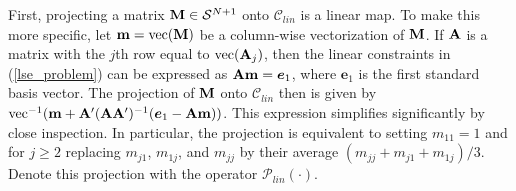 \documentclass[11pt]{article}
\newcommand{\R}{\mathbb{R}}
\theoremstyle{definition}
\theoremstyle{definition}
\def\s{{\bf s}}
\def\m{{\bf m}}
\def\A{{\bf A}}
\def\M{{\bf M}}
\def\vec{\text{vec}}
\begin{document}
%
%







First, projecting a matrix $\M \in \mathcal{S}^{N+1}$  onto $\mathcal{C}_{lin}$ is a linear map. To make this more specific, let $\m = \vec(\M)$ be a column-wise vectorization of $\M$. 
If $\A$ is a matrix with the $j$th row equal to $\vec(\A_j)$, then the  linear constraints in (\ref{lse_problem}) can be expressed as $\A\m =  \boldsymbol{e}_1$, where $\boldsymbol{e}_1$ is the first standard basis vector. The projection of  $\M$ onto $\mathcal{C}_{lin}$ then is given by $\vec^{-1}(\m + \A' (\A \A')^{-1}(\boldsymbol{e}_1 - \A\m))$. This expression simplifies significantly by close inspection. In particular, the projection is equivalent to setting $m_{11} = 1$ and for $j \geq 2$ replacing $m_{j1}$, $m_{1j}$, and $m_{jj}$ by their average $(m_{jj} + m_{j1} + m_{1j})/3$. Denote this projection with the operator $\mathcal{P}_{lin}(\cdot)$. 
\end{document}
